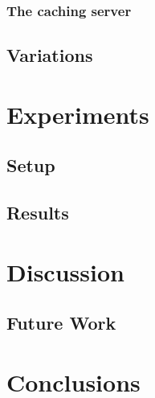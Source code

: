 \documentclass[twoside,openright]{uva-bachelor-thesis}
\begin{document}
\subsection{The caching server}
\section{Variations}

\chapter{Experiments}
\section{Setup}
\section{Results}

\chapter{Discussion}
\section{Future Work}
\chapter{Conclusions}


\printbibliography{}
\end{document}
